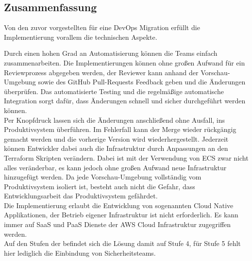 \subsection{Zusammenfassung}\label{zusammenfassung}

Von den zuvor vorgestellten  für eine DevOps Migration erfüllt die Implementierung vorallem die technischen Aspekte.

Durch einen hohen Grad an Automatisierung können die Teams einfach zusammenarbeiten.
Die Implementierungen können ohne großen Aufwand für ein Reviewprozess abgegeben werden, der Reviewer kann anhand der Vorschau-Umgebung
sowie des GitHub Pull-Requests Feedback geben und die Änderungen überprüfen.
Das automatisierte Testing und die regelmäßige automatische Integration sorgt dafür,
dass Änderungen schnell und sicher durchgeführt werden können. \\

Per Knopfdruck lassen sich die Änderungen anschließend ohne Ausfall, ins Produktivsystem überführen.
Im Fehlerfall kann der Merge wieder rückgängig gemacht werden und die vorherige Version wird wiederhergestellt.
Jederzeit können Entwickler dabei auch die Infrastruktur durch Anpassungen an den Terraform Skripten verändern.
Dabei ist mit der Verwendung von ECS zwar nicht alles veränderbar, es kann jedoch ohne großen Aufwand neue Infrastruktur hinzugefügt werden.
Da jede Vorschau-Umgebung vollständig vom Produktivsystem isoliert ist, besteht auch nicht die Gefahr, dass Entwicklungsarbeit das Produktivsystem gefährdet. \\

Die Implementierung erlaubt die Entwicklung von sogenannten Cloud Native Applikationen, der Betrieb eigener Infrastruktur ist nicht erforderlich.
Es kann immer auf SaaS und PaaS Dienste der AWS Cloud Infrastruktur zugegriffen werden. \\

Auf den Stufen der  befindet sich die Lösung damit auf Stufe 4, für Stufe 5 fehlt hier lediglich die Einbindung von Sicherheitsteams.

